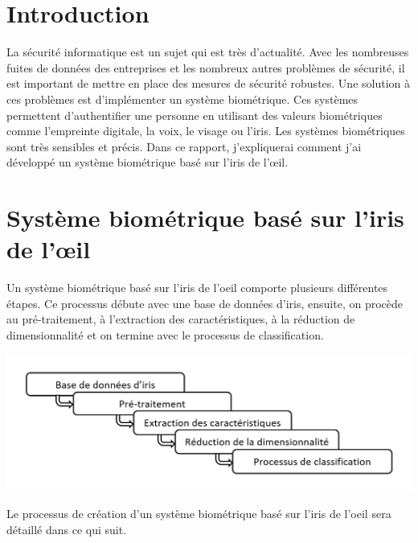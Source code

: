 \documentclass[12pt,twoside,letterpaper]{article}
\begin{document}



\tableofcontents
\newpage

\section{Introduction}
La sécurité informatique est un sujet qui est très d'actualité. Avec les nombreuses fuites de données des entreprises et les nombreux autres problèmes de sécurité, il est important de mettre en place des mesures de sécurité robustes. Une solution à ces problèmes est d'implémenter un système biométrique. Ces systèmes permettent d'authentifier une personne en utilisant des valeurs biométriques comme l'empreinte digitale, la voix, le visage ou l'iris. Les systèmes biométriques sont très sensibles et précis. Dans ce rapport, j'expliquerai comment j'ai développé un système biométrique basé sur l’iris de l’œil.
\cite{ref_06}

\section{Système biométrique basé sur l’iris de l’œil}

Un système biométrique basé sur l'iris de l'oeil comporte plusieurs différentes étapes. Ce processus débute avec une base de données d'iris, ensuite, on procède au pré-traitement, à l'extraction des caractéristiques, à la réduction de dimensionnalité et on termine avec le processus de classification. 

\begin{center}
    \includegraphics[width = 14cm]{schema}
\end{center}

Le processus de création d'un système biométrique basé sur l'iris de l'oeil sera détaillé dans ce qui suit.
\end{document}
